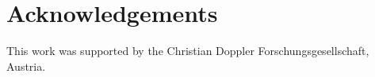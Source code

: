 \section{Acknowledgements}
This work
was supported by the Christian Doppler Forschungsgesellschaft, Austria.